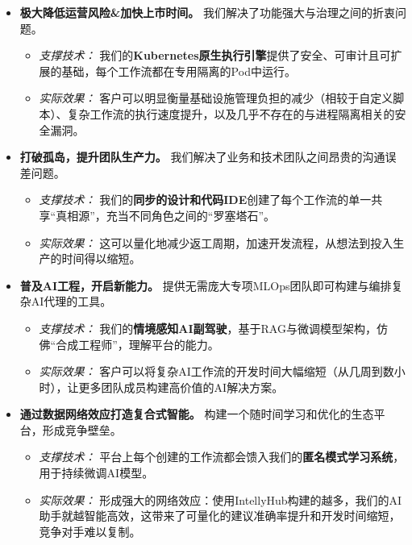 \documentclass[11点, A4纸, 单面]{article}
\begin{document}
\begin{itemize}
    \item \textbf{极大降低运营风险\&加快上市时间。} 我们解决了功能强大与治理之间的折衷问题。
    \begin{itemize}
        \item \textit{支撑技术：} 我们的\textbf{Kubernetes原生执行引擎}提供了安全、可审计且可扩展的基础，每个工作流都在专用隔离的Pod中运行。
        \item \textit{实际效果：} 客户可以明显衡量基础设施管理负担的减少（相较于自定义脚本）、复杂工作流的执行速度提升，以及几乎不存在的与进程隔离相关的安全漏洞。
    \end{itemize}

    \item \textbf{打破孤岛，提升团队生产力。} 我们解决了业务和技术团队之间昂贵的沟通误差问题。
    \begin{itemize}
        \item \textit{支撑技术：} 我们的\textbf{同步的设计和代码IDE}创建了每个工作流的单一共享“真相源”，充当不同角色之间的“罗塞塔石”。
        \item \textit{实际效果：} 这可以量化地减少返工周期，加速开发流程，从想法到投入生产的时间得以缩短。
    \end{itemize}

    \item \textbf{普及AI工程，开启新能力。} 提供无需庞大专项MLOps团队即可构建与编排复杂AI代理的工具。
    \begin{itemize}
        \item \textit{支撑技术：} 我们的\textbf{情境感知AI副驾驶}，基于RAG与微调模型架构，仿佛“合成工程师”，理解平台的能力。
        \item \textit{实际效果：} 客户可以将复杂AI工作流的开发时间大幅缩短（从几周到数小时），让更多团队成员构建高价值的AI解决方案。
    \end{itemize}
    
    \item \textbf{通过数据网络效应打造复合式智能。} 构建一个随时间学习和优化的生态平台，形成竞争壁垒。
    \begin{itemize}
        \item \textit{支撑技术：} 平台上每个创建的工作流都会馈入我们的\textbf{匿名模式学习系统}，用于持续微调AI模型。
        \item \textit{实际效果：} 形成强大的网络效应：使用IntellyHub构建的越多，我们的AI助手就越智能高效，这带来了可量化的建议准确率提升和开发时间缩短，竞争对手难以复制。
    \end{itemize}
\end{itemize}
\end{document}
